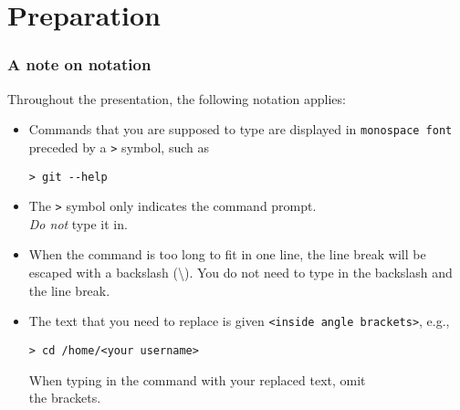 \section{Preparation}

\begin{frame}[fragile]

\frametitle{A note on notation}
	
Throughout the presentation, the following notation applies:

\begin{itemize}
	\item Commands that you are supposed to type are displayed in \texttt{monospace font} preceded by a \texttt{>} symbol, such as
	\begin{verbatim}
> git --help
	\end{verbatim}
	\item The \texttt{>} symbol only indicates the command prompt.\\ \textit{Do not} type it in.
	\item When the command is too long to fit in one line, the line break will be escaped with a backslash (\textbackslash). You do not need to type in the backslash and the line break.
	\item The text that you need to replace is given \texttt{<inside angle brackets>}, e.g.,
	\begin{verbatim}
> cd /home/<your username>
	\end{verbatim}
	When typing in the command with your replaced text, omit \\the brackets.
\end{itemize}

\end{frame}


